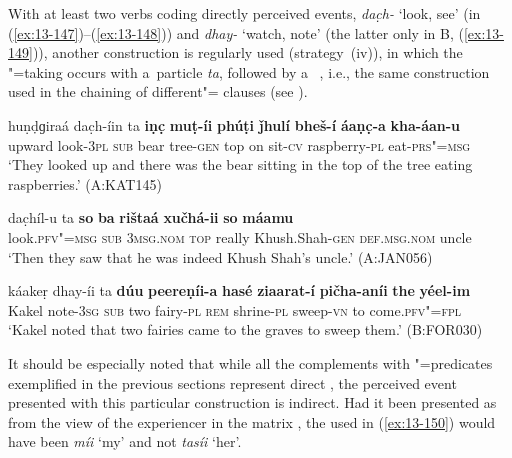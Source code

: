  With at least two verbs coding directly perceived events, \textit{dac̣h-} `look, see' (in (\ref{ex:13-147})--(\ref{ex:13-148})) and \textit{dhay-} `watch, note' (the latter only in B, (\ref{ex:13-149})), another construction is regularly used (strategy~(iv)), in which the  "=taking  occurs with a~particle \textit{ta}, followed by a~ , i.e., the same construction used in the chaining of different"= clauses (see ). 

\largerpage
\ea
\label{ex:13-147}
\gll huṇḍɡiraá dac̣h-íin ta \textbf{iṇc̣} \textbf{muṭ-íi} \textbf{phúṭi} \textbf{ǰhulí} \textbf{bheš-í} \textbf{áaṇc̣-a} \textbf{kha-áan-u}\\
upward look-\textsc{3pl} \textsc{sub} bear tree-\textsc{gen} top on sit-\textsc{cv} raspberry-\textsc{pl} eat-\textsc{prs"=msg}\\
\glt `They looked up and there was the bear sitting in the top of the tree eating raspberries.' (A:KAT145)
\z

\ea
\label{ex:13-148}
\gll dac̣híl-u ta \textbf{so} \textbf{ba} \textbf{rištaá} \textbf{xučhá-ii} \textbf{so} \textbf{máamu}\\
look.\textsc{pfv"=msg} \textsc{sub} \textsc{3msg.nom} \textsc{top} really Khush.Shah-\textsc{gen} \textsc{def.msg.nom} uncle\\
\glt `Then they saw that he was indeed Khush Shah's uncle.' (A:JAN056)

\ex
\label{ex:13-149}
\gll káakeṛ dhay-íi ta \textbf{dúu} \textbf{peereṇíi-a} \textbf{hasé} \textbf{ziaarat-í} \textbf{pičha-aníi} \textbf{the} \textbf{yéel-im}\\
Kakel note-\textsc{3sg} \textsc{sub} two fairy-\textsc{pl}  \textsc{rem} shrine-\textsc{pl} sweep-\textsc{vn} to come.\textsc{pfv"=fpl}\\
\glt `Kakel noted that two fairies came to the graves to sweep them.' (B:FOR030) 
\z

It should be especially noted that while all the complements with "=predicates exemplified in the previous sections represent direct , the perceived event presented with this particular construction is indirect. Had it been presented as from the view of the experiencer in the matrix , the  used in (\ref{ex:13-150}) would have been \textit{míi} `my' and not \textit{tasíi} `her'.

